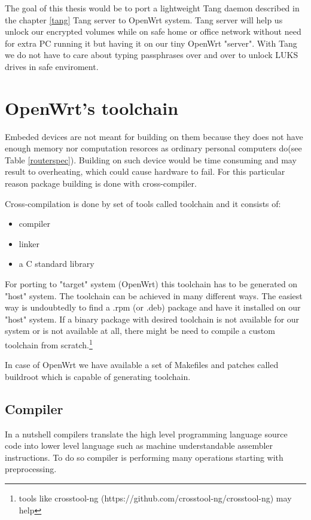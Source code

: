 The goal of this thesis would be to port a lightweight Tang daemon described in the chapter \ref{tang} Tang server to OpenWrt system.
Tang server will help us unlock our encrypted volumes while on safe home or office network without need for extra PC running it but having it on our tiny OpenWrt "server".
With Tang we do not have to care about typing passphrases over and over to unlock LUKS drives in safe enviroment.

\section{OpenWrt's toolchain}

Embeded devices are not meant for building on them because they does not have enough memory nor computation resorces as ordinary personal computers do(see Table \ref{routerspec}).
Building on such device would be time consuming and may result to overheating, which could cause hardware to fail.
For this particular reason package building is done with cross-compiler.

Cross-compilation is done by set of tools called toolchain and it consists of:
\begin{itemize}
    \item compiler
    \item linker
    \item a C standard library
\end{itemize}
For porting to "target" system (OpenWrt) this toolchain has to be generated on "host" system.
The toolchain can be achieved in many different ways.
The easiest way is undoubtedly to find a .rpm (or .deb) package and have it installed on our "host" system.
If a binary package with desired toolchain is not available for our system or is not available at all, there might be need to compile a custom toolchain from scratch.\footnote{tools like crosstool-ng (https://github.com/crosstool-ng/crosstool-ng) may help}

In case of OpenWrt we have available a set of Makefiles and patches called buildroot which is capable of generating toolchain.

\subsection{Compiler} 

In a nutshell compilers translate the high level programming language source code into lower level language such as machine understandable assembler instructions.
To do so compiler is performing many operations starting with preprocessing.

